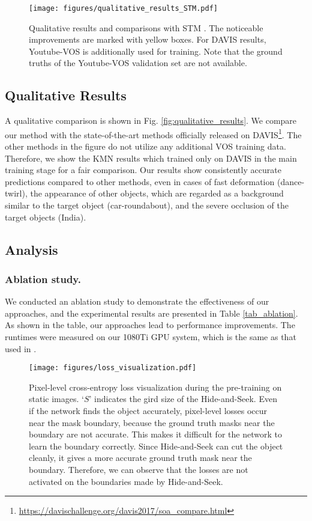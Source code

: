 \documentclass[runningheads]{llncs}
\begin{document}
\begin{figure}
\centering
\texttt{[image: figures/qualitative\_results\_STM.pdf]}
\caption{
Qualitative results and comparisons with STM \cite{Oh_2019_ICCV}. The noticeable improvements are marked with yellow boxes. For DAVIS results, Youtube-VOS is additionally used for training. Note that the ground truths of the Youtube-VOS validation set are not available.
}
\label{fig:qualitative_results_STM}
\end{figure}

\subsection{Qualitative Results}
\label{s45}
A qualitative comparison is shown in Fig. \ref{fig:qualitative_results}. We compare our method with the state-of-the-art methods officially released on DAVIS\footnote{\url{https://davischallenge.org/davis2017/soa\_compare.html}}. The other methods in the figure do not utilize any additional VOS training data. Therefore, we show the KMN results which trained only on DAVIS in the main training stage for a fair comparison. Our results show consistently accurate predictions compared to other methods, even in cases of fast deformation (dance-twirl), the appearance of other objects, which are regarded as a background similar to the target object (car-roundabout), and the severe occlusion of the target objects (India).





\subsection{Analysis}
\label{s46}
\subsubsection{Ablation study.}
We conducted an ablation study to demonstrate the effectiveness of our approaches, and the experimental results are presented in Table \ref{tab_ablation}. As shown in the table, our approaches lead to performance improvements. The runtimes were measured on our 1080Ti GPU system, which is the same as that used in \cite{Oh_2019_ICCV}.


\begin{figure}[t]
\centering
\texttt{[image: figures/loss\_visualization.pdf]}
\caption{
Pixel-level cross-entropy loss visualization during the pre-training on static images. `$S$' indicates the gird size of the Hide-and-Seek. Even if the network finds the object accurately, pixel-level losses occur near the mask boundary, because the ground truth masks near the boundary are not accurate. This makes it difficult for the network to learn the boundary correctly. Since  Hide-and-Seek can cut the object cleanly, it gives a more accurate ground truth mask near the boundary. Therefore, we can observe that the losses are not activated on the boundaries made by Hide-and-Seek.
}
\label{fig:loss_visualization}
\end{figure}
\end{document}
